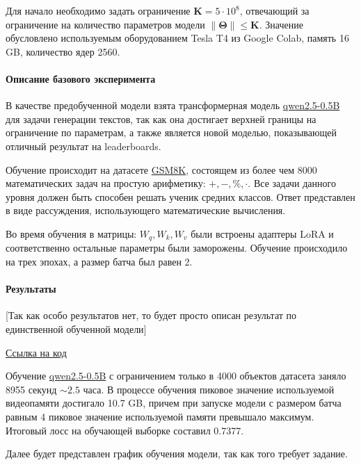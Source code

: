 \documentclass[12pt, twoside]{article}
\newcommand{\bTheta}{\boldsymbol{\Theta}}
\begin{document}
Для начало необходимо задать ограничение $\mathbf{K} = 5\cdot10^8$, отвечающий за ограничение на количество параметров модели $\| \bTheta\| \le \mathbf{K}$. Значение обусловлено используемым оборудованием Tesla T4 из Google Colab, память 16 GB, количество ядер 2560. 

\paragraph{Описание базового эксперимента}
В качестве предобученной модели взята трансформерная модель \href{https://huggingface.co/Qwen/Qwen2.5-0.5B}{qwen2.5-0.5B} для задачи генерации текстов, так как она достигает верхней границы на ограничение по параметрам, а также является новой моделью, показывающей отличный результат на leaderboards.

Обучение происходит на датасете \href{https://huggingface.co/datasets/openai/gsm8k}{GSM8K}, состоящем из более чем 8000 математических задач на простую арифметику: $+, -, \%, \cdot$. Все задачи данного уровня должен быть способен решать ученик средних классов. Ответ представлен в виде рассуждения, использующего математические вычисления.

Во время обучения в матрицы:  $W_q, W_k, W_v$ были встроены адаптеры LoRA и соответственно остальные параметры были заморожены. Обучение происходило на трех эпохах, а размер батча был равен 2.

\paragraph{Результаты}

[Так как особо результатов нет, то будет просто описан результат по единственной обученной модели]

\href{https://github.com/MuQlanyu/2025-Project-178/blob/main/notebooks/reports/report_20.03.ipynb}{Ссылка на код}

Обучение \href{https://huggingface.co/Qwen/Qwen2.5-0.5B}{qwen2.5-0.5B} с ограничением только в 4000 объектов датасета заняло 8955 секунд $\sim 2.5$ часа. В процессе обучения пиковое значение используемой видеопамяти достигало 10.7 GB, причем при запуске модели с размером батча равным 4 пиковое значение используемой памяти превышало максимум. Итоговый лосс на обучающей выборке составил 0.7377.

Далее будет представлен график обучения модели, так как того требует задание.
\end{document}
